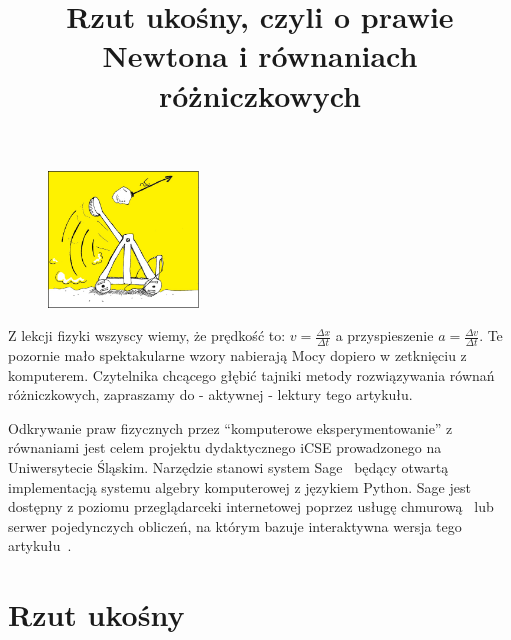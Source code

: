 \documentclass[10pt,twocolumn]{article}
\title{Rzut ukośny, czyli o prawie Newtona i równaniach różniczkowych}
\begin{document}
\maketitle
\begin{figure}
     \includegraphics[width=4cm]{3.jpg}
\end{figure}



Z lekcji fizyki wszyscy wiemy, że prędkość to: $v=\frac{\Delta
  x}{\Delta t}$ a przyspieszenie $a=\frac{\Delta v}{\Delta t}$. Te
pozornie mało spektakularne wzory nabierają Mocy dopiero w zetknięciu
z komputerem. Czytelnika chcącego głębić tajniki metody rozwiązywania
równań różniczkowych, zapraszamy do - aktywnej - lektury tego
artykułu.


Odkrywanie praw fizycznych przez ``komputerowe eksperymentowanie'' z
równaniami jest celem projektu dydaktycznego iCSE prowadzonego na
Uniwersytecie Śląskim. Narzędzie stanowi system Sage\ \cite{sagemath}
będący otwartą implementacją systemu algebry komputerowej z językiem
Python. Sage jest dostępny z poziomu przeglądarceki internetowej
poprzez usługę chmurową\ \cite{cloud} lub serwer pojedynczych obliczeń, na
którym bazuje interaktywna wersja tego artykułu\ \cite{web}.
%
 


\section{Rzut ukośny}
\end{document}
